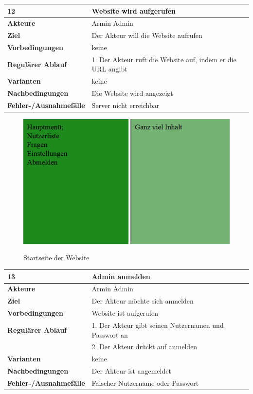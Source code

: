 \documentclass[fontsize=12pt,paper=a4,twoside]{scrartcl}
\begin{document}
\begin{table}
	[H] \label{12} 
	\begin{tabular}
		{|l|p{10cm}|} \hline \textbf{12} & \textbf{Website wird aufgerufen} \\
		\hline \textbf{Akteure} & Armin Admin\\
		\hline \textbf{Ziel} & Der Akteur will die Website aufrufen\\
		\hline \textbf{Vorbedingungen} & keine\\
		\hline \textbf{Regulärer Ablauf} & 1. Der Akteur ruft die Website auf, indem er die URL angibt\\
		\hline \textbf{Varianten} & keine \\
		\hline \textbf{Nachbedingungen} & Die Website wird angezeigt\\
		\hline \textbf{Fehler-/Ausnahmefälle} & Server nicht erreichbar \\
		\hline 
	\end{tabular}
\end{table}

\begin{figure}
	[H] \caption{Startseite der Website} 
	\includegraphics[width=0.6
	\textwidth]{Bilder/WebseiteMenu.png} \label{pic:ques} 
\end{figure}

\begin{table}
	[H] \label{13} 
	\begin{tabular}
		{|l|p{10cm}|} \hline \textbf{13} & \textbf{Admin anmelden} \\
		\hline \textbf{Akteure} & Armin Admin\\
		\hline \textbf{Ziel} & Der Akteur möchte sich anmelden\\
		\hline \textbf{Vorbedingungen} & Website ist aufgerufen\\
		\hline \textbf{Regulärer Ablauf} & 1. Der Akteur gibt seinen Nutzernamen und Passwort an\\
		&2. Der Akteur drückt auf anmelden\\
		\hline \textbf{Varianten} & keine \\
		\hline \textbf{Nachbedingungen} & Der Akteur ist angemeldet\\
		\hline \textbf{Fehler-/Ausnahmefälle} & Falscher Nutzername oder Passwort \\
		\hline 
	\end{tabular}
\end{table}
\end{document}

